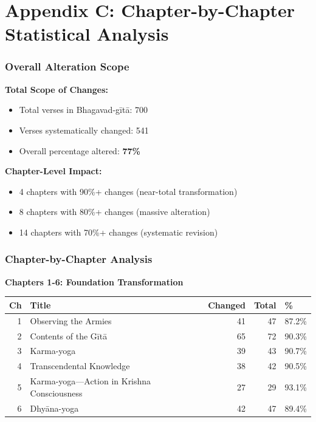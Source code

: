 \documentclass[11pt,twoside]{book}
\begin{document}
\part*{Appendix C: Chapter-by-Chapter Statistical Analysis}
\label{sec:org637959b}
\section*{Overall Alteration Scope}
\label{sec:org11de9e2}

\textbf{\textbf{Total Scope of Changes:}}
\begin{itemize}
\item Total verses in Bhagavad-gītā: 700
\item Verses systematically changed: 541
\item Overall percentage altered: \textbf{\textbf{77\%}}
\end{itemize}

\textbf{\textbf{Chapter-Level Impact:}}
\begin{itemize}
\item 4 chapters with 90\%+ changes (near-total transformation)
\item 8 chapters with 80\%+ changes (massive alteration)
\item 14 chapters with 70\%+ changes (systematic revision)
\end{itemize}
\section*{Chapter-by-Chapter Analysis}
\label{sec:orge8f51a4}

\textbf{\textbf{Chapters 1-6: Foundation Transformation}}

\small
\begin{center}
\begin{tabular}{rlrrl}
Ch & Title & Changed & Total & \%\\
\hline
1 & Observing the Armies & 41 & 47 & 87.2\%\\
2 & Contents of the Gītā & 65 & 72 & 90.3\%\\
3 & Karma-yoga & 39 & 43 & 90.7\%\\
4 & Transcendental Knowledge & 38 & 42 & 90.5\%\\
5 & Karma-yoga—Action in Krishna Consciousness & 27 & 29 & 93.1\%\\
6 & Dhyāna-yoga & 42 & 47 & 89.4\%\\
\end{tabular}
\end{center}
\end{document}
